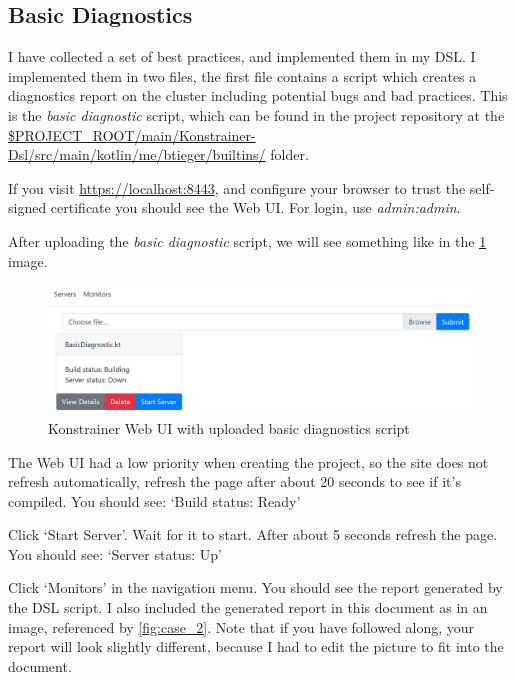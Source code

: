 \subsection{Basic Diagnostics}

I have collected a set of best practices, and implemented them in my DSL. I implemented them in two files, the first file contains a script which creates a diagnostics report on the cluster including potential bugs and bad practices. This is the \emph{basic diagnostic} script, which can be found in the project repository at the \url{$PROJECT_ROOT/main/Konstrainer-Dsl/src/main/kotlin/me/btieger/builtins/} folder.

If you visit \url{https://localhost:8443}, and configure your browser to trust the self-signed certificate you should see the Web UI. For login, use \emph{admin:admin}. 

After uploading the \emph{basic diagnostic} script, we will see something like in the \ref{fig:case_1} image.

\begin{figure}[h]
  \centering
  \includegraphics[width=130mm, keepaspectratio]{content/30_caseStudy1/main_menu_with_uploaded_building_dagnotics.png}
  \caption{Konstrainer Web UI with uploaded basic diagnostics script}
  \label{fig:case_1}
\end{figure}

The Web UI had a low priority when creating the project, so the site does not refresh automatically, refresh the page after about 20 seconds to see if it's compiled. You should see: `Build status: Ready'

Click `Start Server'. Wait for it to start. After about 5 seconds refresh the page. You should see: `Server status: Up'

Click `Monitors' in the navigation menu. You should see the report generated by the DSL script. I also included the generated report in this document as in an image, referenced by \ref{fig:case_2}. Note that if you have followed along, your report will look slightly different, because I had to edit the picture to fit into the document.

